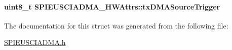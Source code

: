 \paragraph[{tx\+D\+M\+A\+Source\+Trigger}]{\setlength{\rightskip}{0pt plus 5cm}uint8\+\_\+t S\+P\+I\+E\+U\+S\+C\+I\+A\+D\+M\+A\+\_\+\+H\+W\+Attrs\+::tx\+D\+M\+A\+Source\+Trigger}\label{struct_s_p_i_e_u_s_c_i_a_d_m_a___h_w_attrs_a381d4d773f4c309e35eec9da42305037}


The documentation for this struct was generated from the following file\+:\begin{DoxyCompactItemize}
\item 
\hyperlink{_s_p_i_e_u_s_c_i_a_d_m_a_8h}{S\+P\+I\+E\+U\+S\+C\+I\+A\+D\+M\+A.\+h}\end{DoxyCompactItemize}
